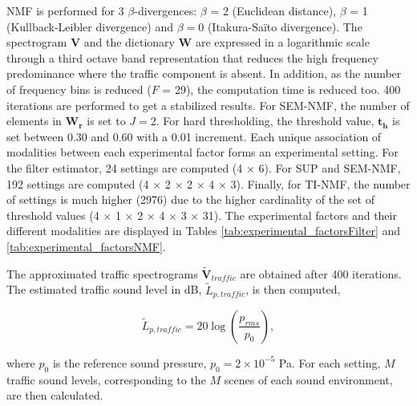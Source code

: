 \documentclass[review,5p,twocolumn,sort&compress,times]{elsarticle}
\begin{document}
NMF is performed for 3 $\beta$-divergences: $\beta$ = 2 (Euclidean distance), $\beta$ = 1 (Kullback-Leibler divergence) and $\beta = 0$ (Itakura-Sa\"ito divergence). The spectrogram $\mathbf{V}$ and the dictionary $\mathbf{W}$ are expressed in a logarithmic scale through a third octave band representation that reduces the high frequency predominance where the traffic component is absent. In addition, as the number of frequency bins is reduced ($F$ = 29), the computation time is reduced too. 400 iterations are performed to get a stabilized results. For SEM-NMF, the number of elements in $\mathbf{W_r}$ is set to $J = 2$. For hard thresholding, the threshold value, $\mathbf{t_h}$ is set between 0.30 and 0.60 with a 0.01 increment.
Each unique association of modalities between each experimental factor forms an experimental setting. For the filter estimator, 24 settings are computed (4 $\times$ 6). For SUP and SEM-NMF, 192 settings are computed (4 $\times$ 2 $\times$ 2 $\times$ 4 $\times$ 3). Finally, for TI-NMF, the number of settings is much higher (2976) due to the higher cardinality of the set of threshold values (4 $\times$ 1 $\times$ 2 $\times$ 4  $\times$ 3 $\times$ 31).
The experimental factors and their different modalities are displayed in Tables \ref{tab:experimental_factorsFilter} and \ref{tab:experimental_factorsNMF}.

The approximated traffic spectrograms $\mathbf{\tilde{V}}_{traffic}$ are obtained after 400 iterations. The estimated traffic sound level in dB, $\tilde{L}_{p, traffic}$, is then computed,

\begin{equation}
\tilde{L}_{p, traffic} = 20\log\left(\frac{p_{rms}}{p_0}\right),
\end{equation}

where $p_0$ is the reference sound pressure, $p_0 = 2\times 10^{-5}$ Pa. For each setting, $M$ traffic sound levels, corresponding to the $M$ scenes of each sound environment, are then calculated.
\end{document}
